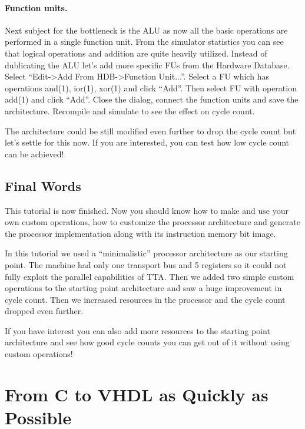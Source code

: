 \documentclass[twoside]{tceusermanual}
\begin{document}
\paragraph{Function units.}
Next subject for the bottleneck is the ALU as now all the basic operations
are performed in a single function unit. From the simulator statistics you can
see that logical operations and addition are quite heavily utilized. Instead
of dublicating the ALU let's add more specific FUs from the Hardware Database.
Select ``Edit->Add From HDB->Function Unit...''. Select a FU which has
operations and(1), ior(1), xor(1) and click ``Add''. Then select FU with operation
add(1) and click ``Add''. Close the dialog, connect the function units and save the
architecture. Recompile and simulate to see the effect on cycle count.

The architecture could be still modified even further to drop the cycle count
but let's settle for this now. If you are interested, you can test how low
cycle count can be achieved!


\subsection{Final Words}

This tutorial is now finished. Now you should know how to make and use your
own custom operations, how to customize the processor architecture and
generate the processor implementation along with its instruction memory bit
image.

In this tutorial we used a ``minimalistic'' processor architecture as our
starting point. The machine had only one transport bus and 5 registers so it
could not fully exploit the parallel capabilities of TTA.  Then we added two
simple custom operations to the starting point architecture and saw a huge
improvement in cycle count. Then we increased resources in the processor and
the cycle count dropped even further.

If you have interest you can also add more resources to the starting point
architecture and see how good cycle counts you can get out of it without
using custom operations!


\section{From C to VHDL as Quickly as Possible}
\label{section:fromCtoVHDL}
 
\end{document}
